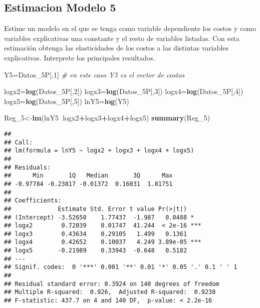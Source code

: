 \documentclass[
]{article}
\newenvironment{Shaded}{\begin{snugshade}}{\end{snugshade}}
\newcommand{\CommentTok}[1]{\textcolor[rgb]{0.56,0.35,0.01}{\textit{#1}}}
\newcommand{\DecValTok}[1]{\textcolor[rgb]{0.00,0.00,0.81}{#1}}
\newcommand{\KeywordTok}[1]{\textcolor[rgb]{0.13,0.29,0.53}{\textbf{#1}}}
\newcommand{\NormalTok}[1]{#1}
\newcommand{\OperatorTok}[1]{\textcolor[rgb]{0.81,0.36,0.00}{\textbf{#1}}}
\begin{document}
\hypertarget{estimacion-modelo-5}{%
\subsection{Estimacion Modelo 5}\label{estimacion-modelo-5}}

Estime un modelo en el que se tenga como variable dependiente los costos
y como variables explicativas una constante y el resto de variables
listadas. Con esta estimación obtenga las elasticidades de los costos a
las distintas variables explicativas. Interprete los principales
resultados.

\begin{Shaded}
\begin{Highlighting}[]
\NormalTok{Y5=Datos_5P[,}\DecValTok{1}\NormalTok{] }\CommentTok{#  en este caso Y5 es el vector de costos }

\NormalTok{logx2=}\KeywordTok{log}\NormalTok{(Datos_5P[,}\DecValTok{2}\NormalTok{])}
\NormalTok{logx3=}\KeywordTok{log}\NormalTok{(Datos_5P[,}\DecValTok{3}\NormalTok{])}
\NormalTok{logx4=}\KeywordTok{log}\NormalTok{(Datos_5P[,}\DecValTok{4}\NormalTok{])}
\NormalTok{logx5=}\KeywordTok{log}\NormalTok{(Datos_5P[,}\DecValTok{5}\NormalTok{])}
\NormalTok{lnY5=}\KeywordTok{log}\NormalTok{(Y5)}


\NormalTok{Reg_}\DecValTok{5}\NormalTok{<-}\KeywordTok{lm}\NormalTok{(lnY5}\OperatorTok{~}\NormalTok{logx2}\OperatorTok{+}\NormalTok{logx3}\OperatorTok{+}\NormalTok{logx4}\OperatorTok{+}\NormalTok{logx5)}
\KeywordTok{summary}\NormalTok{(Reg_}\DecValTok{5}\NormalTok{)}
\end{Highlighting}
\end{Shaded}

\begin{verbatim}
## 
## Call:
## lm(formula = lnY5 ~ logx2 + logx3 + logx4 + logx5)
## 
## Residuals:
##      Min       1Q   Median       3Q      Max 
## -0.97784 -0.23817 -0.01372  0.16031  1.81751 
## 
## Coefficients:
##             Estimate Std. Error t value Pr(>|t|)    
## (Intercept) -3.52650    1.77437  -1.987   0.0488 *  
## logx2        0.72039    0.01747  41.244  < 2e-16 ***
## logx3        0.43634    0.29105   1.499   0.1361    
## logx4        0.42652    0.10037   4.249 3.89e-05 ***
## logx5       -0.21989    0.33943  -0.648   0.5182    
## ---
## Signif. codes:  0 '***' 0.001 '**' 0.01 '*' 0.05 '.' 0.1 ' ' 1
## 
## Residual standard error: 0.3924 on 140 degrees of freedom
## Multiple R-squared:  0.926,  Adjusted R-squared:  0.9238 
## F-statistic: 437.7 on 4 and 140 DF,  p-value: < 2.2e-16
\end{verbatim}
\end{document}
